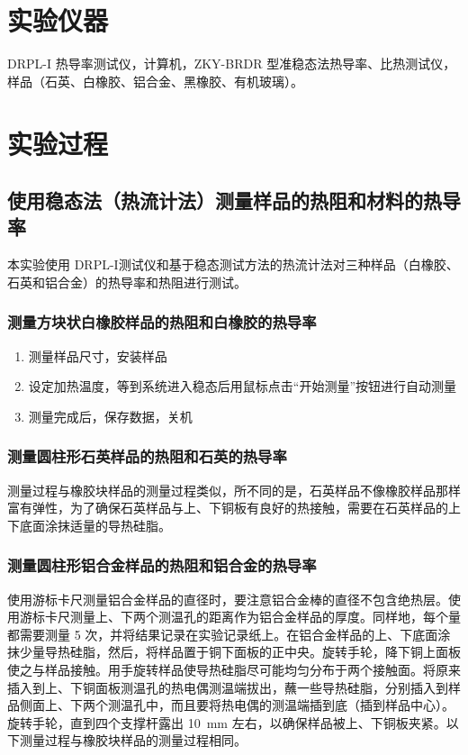 \documentclass[a4paper,utf8]{article}
\begin{document}
\section{实验仪器}%
    DRPL-I 热导率测试仪，计算机，ZKY-BRDR 型准稳态法热导率、比热测试仪，样品（石英、白橡胶、铝合金、黑橡胶、有机玻璃）。
    \section{实验过程}%
    \subsection{使用稳态法（热流计法）测量样品的热阻和材料的热导率}
    本实验使用 DRPL-I测试仪和基于稳态测试方法的热流计法对三种样品（白橡胶、石英和铝合金）的热导率和热阻进行测试。
        \subsubsection{测量方块状白橡胶样品的热阻和白橡胶的热导率}
        \begin{enumerate}
            \item 测量样品尺寸，安装样品
            \item 设定加热温度，等到系统进入稳态后用鼠标点击“开始测量”按钮进行自动测量
            \item 测量完成后，保存数据，关机
        \end{enumerate}
        \subsubsection{测量圆柱形石英样品的热阻和石英的热导率}
        测量过程与橡胶块样品的测量过程类似，所不同的是，石英样品不像橡胶样品那样富有弹性，为了确保石英样品与上、下铜板有良好的热接触，需要在石英样品的上下底面涂抹适量的导热硅脂。
        \subsubsection{测量圆柱形铝合金样品的热阻和铝合金的热导率}
        使用游标卡尺测量铝合金样品的直径时，要注意铝合金棒的直径不包含绝热层。使用游标卡尺测量上、下两个测温孔的距离作为铝合金样品的厚度。同样地，每个量都需要测量 5 次，并将结果记录在实验记录纸上。在铝合金样品的上、下底面涂抹少量导热硅脂，然后，将样品置于铜下面板的正中央。旋转手轮，降下铜上面板使之与样品接触。用手旋转样品使导热硅脂尽可能均匀分布于两个接触面。将原来插入到上、下铜面板测温孔的热电偶测温端拔出，蘸一些导热硅脂，分别插入到样品侧面上、下两个测温孔中，而且要将热电偶的测温端插到底（插到样品中心）。旋转手轮，直到四个支撑杆露出 \SI{10}{\mm} 左右，以确保样品被上、下铜板夹紧。以下测量过程与橡胶块样品的测量过程相同。
\end{document}

